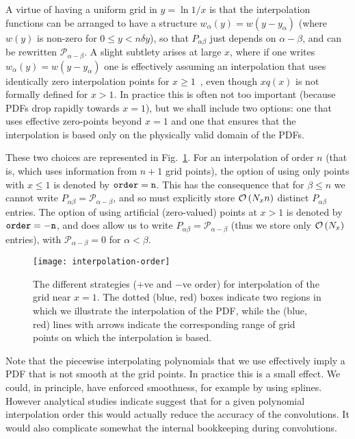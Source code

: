 \documentclass[12pt]{article}
\newcommand{\order}[1]{{\cal O}\left(#1\right)}
\begin{document}
A virtue
 of having a uniform grid in $y = \ln 1/x$ is that the
interpolation functions can be arranged to have a structure
$w_\alpha(y) = w(y - y_\alpha)$ (where $w(y)$ is non-zero for $0\le y <
n \delta y$), so that $P_{\alpha\beta}$ just depends
on $\alpha - \beta$, and can be rewritten $\mathcal{P}_{\alpha - \beta}$. A
slight subtlety arises at large $x$, where if one writes $w_\alpha(y) =
w(y - y_\alpha)$ one is effectively assuming an interpolation that uses
identically zero interpolation points for $x\ge 1$~\cite{Cafarella:2003jr,Cafarella:2005zj,Cafarella:2008du,
Ratcliffe:2000kp},
even though $xq(x)$ is not formally defined for $x > 1$. In practice
this is often not too important (because PDFs drop rapidly towards
$x=1$), but we shall include two options: one that uses effective
zero-points beyond $x=1$ and one that ensures that the interpolation
is based only on the physically valid domain of the PDFs.

These two choices are represented in
Fig.~\ref{fig:interpolation-orders}.  For an interpolation of order
$n$ (that is, which uses information from $n+1$ grid points), the
option of using only points with $x\le 1$ is denoted by $\tt order=n$.
This has the consequence that for $\beta \le n$ we cannot write
$P_{\alpha\beta} = \mathcal{P}_{\alpha-\beta}$, and so must explicitly
store $\order{N_x n}$ distinct $P_{\alpha\beta}$ entries.
%
The option of using artificial (zero-valued) points at $x>1$ is denoted by $\tt
order=-n$, and does allow us to write $P_{\alpha\beta} =
\mathcal{P}_{\alpha-\beta}$ (thus we store only $\order{N_x}$
entries), with $\mathcal{P}_{\alpha-\beta} = 0$ for $\alpha < \beta$.

\begin{figure}
  \centering
  \texttt{[image: interpolation-order]}%
  \caption{The different strategies (+ve and $-$ve order) for
    interpolation of the grid near $x=1$. The dotted (blue, red) boxes
    indicate two regions in which we illustrate the interpolation of
    the PDF, while the (blue, red) lines with arrows indicate the
    corresponding range of grid points on which the interpolation is
    based.}
  \label{fig:interpolation-orders}
\end{figure}


Note that the piecewise interpolating polynomials that we use effectively
imply a PDF that is not smooth at
the grid points. In practice this is a small effect. We could, in
principle, have enforced smoothness, for example by using
splines. However analytical studies indicate suggest that for a given
polynomial interpolation order this would actually reduce the accuracy
of the convolutions. It would also complicate somewhat the internal
bookkeeping during convolutions.
\end{document}
